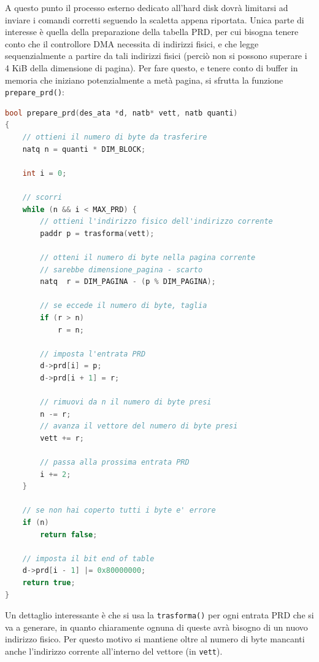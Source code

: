 \documentclass[a4paper,11pt]{article}
\begin{document}
A questo punto il processo esterno dedicato all'hard disk dovrà limitarsi ad inviare i comandi corretti seguendo la scaletta appena riportata.
Unica parte di interesse è quella della preparazione della tabella PRD, per cui bisogna tenere conto che il controllore DMA necessita di indirizzi fisici, e che legge sequenzialmente a partire da tali indirizzi fisici (perciò non si possono superare i 4 KiB della dimensione di pagina).
Per fare questo, e tenere conto di buffer in memoria che iniziano potenzialmente a metà pagina, si sfrutta la funzione \lstinline|prepare_prd()|:
\begin{lstlisting}[language=C++, style=codestyle]	
bool prepare_prd(des_ata *d, natb* vett, natb quanti)
{
	// ottieni il numero di byte da trasferire
	natq n = quanti * DIM_BLOCK;

	int i = 0;

	// scorri
	while (n && i < MAX_PRD) {
		// ottieni l'indirizzo fisico dell'indirizzo corrente
		paddr p = trasforma(vett);

		// otteni il numero di byte nella pagina corrente
		// sarebbe dimensione_pagina - scarto
		natq  r = DIM_PAGINA - (p % DIM_PAGINA);
		
		// se eccede il numero di byte, taglia
		if (r > n)
			r = n;

		// imposta l'entrata PRD
		d->prd[i] = p;
		d->prd[i + 1] = r;
		
		// rimuovi da n il numero di byte presi
		n -= r;
		// avanza il vettore del numero di byte presi
		vett += r;

		// passa alla prossima entrata PRD
		i += 2;
	}

	// se non hai coperto tutti i byte e' errore
	if (n)
		return false;
	
	// imposta il bit end of table
	d->prd[i - 1] |= 0x80000000;
	return true;
}
\end{lstlisting}
Un dettaglio interessante è che si usa la \lstinline|trasforma()| per ogni entrata PRD che si va a generare, in quanto chiaramente ognuna di queste avrà bisogno di un nuovo indirizzo fisico.
Per questo motivo si mantiene oltre al numero di byte mancanti anche l'indirizzo corrente all'interno del vettore (in \lstinline|vett|).
\end{document}
